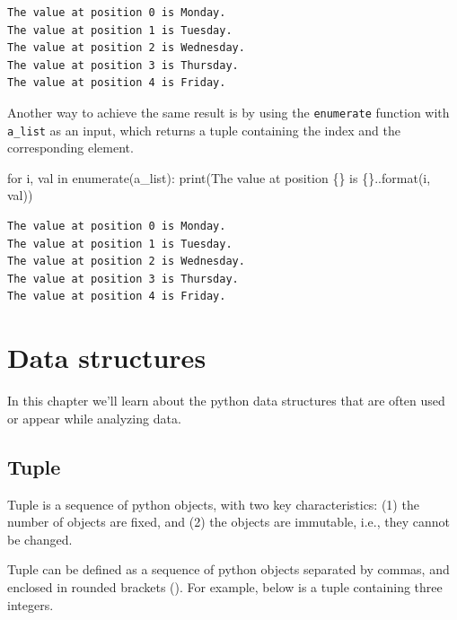 \documentclass[
  letterpaper,
  DIV=11,
  numbers=noendperiod]{scrreprt}
\newenvironment{Shaded}{\begin{snugshade}}{\end{snugshade}}
\newcommand{\BuiltInTok}[1]{\textcolor[rgb]{0.00,0.23,0.31}{#1}}
\newcommand{\ControlFlowTok}[1]{\textcolor[rgb]{0.00,0.23,0.31}{#1}}
\newcommand{\KeywordTok}[1]{\textcolor[rgb]{0.00,0.23,0.31}{#1}}
\newcommand{\NormalTok}[1]{\textcolor[rgb]{0.00,0.23,0.31}{#1}}
\newcommand{\SpecialCharTok}[1]{\textcolor[rgb]{0.37,0.37,0.37}{#1}}
\newcommand{\StringTok}[1]{\textcolor[rgb]{0.13,0.47,0.30}{#1}}
\begin{document}
\begin{verbatim}
The value at position 0 is Monday.
The value at position 1 is Tuesday.
The value at position 2 is Wednesday.
The value at position 3 is Thursday.
The value at position 4 is Friday.
\end{verbatim}

Another way to achieve the same result is by using the
\texttt{enumerate} function with \texttt{a\_list} as an input, which
returns a tuple containing the index and the corresponding element.

\begin{Shaded}
\begin{Highlighting}[]
\ControlFlowTok{for}\NormalTok{ i, val }\KeywordTok{in} \BuiltInTok{enumerate}\NormalTok{(a\_list):}
    \BuiltInTok{print}\NormalTok{(}\StringTok{\textquotesingle{}The value at position }\SpecialCharTok{\{\}}\StringTok{ is }\SpecialCharTok{\{\}}\StringTok{.\textquotesingle{}}\NormalTok{.}\BuiltInTok{format}\NormalTok{(i, val))}
\end{Highlighting}
\end{Shaded}

\begin{verbatim}
The value at position 0 is Monday.
The value at position 1 is Tuesday.
The value at position 2 is Wednesday.
The value at position 3 is Thursday.
The value at position 4 is Friday.
\end{verbatim}

\hypertarget{data-structures}{%
\chapter{Data structures}\label{data-structures}}

In this chapter we'll learn about the python data structures that are
often used or appear while analyzing data.

\hypertarget{tuple}{%
\section{Tuple}\label{tuple}}

Tuple is a sequence of python objects, with two key characteristics: (1)
the number of objects are fixed, and (2) the objects are immutable,
i.e., they cannot be changed.

Tuple can be defined as a sequence of python objects separated by
commas, and enclosed in rounded brackets (). For example, below is a
tuple containing three integers.
\end{document}
